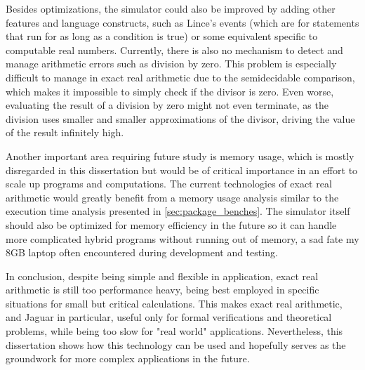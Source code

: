 Besides optimizations, the simulator could also be improved by adding other features and language constructs, such as Lince's events (which are for statements that run for as long as a condition is true) or some equivalent specific to computable real numbers. Currently, there is also no mechanism to detect and manage arithmetic errors such as division by zero. This problem is especially difficult to manage in exact real arithmetic due to the semidecidable comparison, which makes it impossible to simply check if the divisor is zero. Even worse, evaluating the result of a division by zero might not even terminate, as the division uses smaller and smaller approximations of the divisor, driving the value of the result infinitely high.

Another important area requiring future study is memory usage, which is mostly disregarded in this dissertation but would be of critical importance in an effort to scale up programs and computations. The current technologies of exact real arithmetic would greatly benefit from a memory usage analysis similar to the execution time analysis presented in \cref{sec:package_benches}. The simulator itself should also be optimized for memory efficiency in the future so it can handle more complicated hybrid programs without running out of memory, a sad fate my 8GB laptop often encountered during development and testing.

In conclusion, despite being simple and flexible in application, exact real arithmetic is still too performance heavy, being best employed in specific situations for small but critical calculations. This makes exact real arithmetic, and Jaguar in particular, useful only for formal verifications and theoretical problems, while being too slow for "real world" applications. Nevertheless, this dissertation shows how this technology can be used and hopefully serves as the groundwork for more complex applications in the future.
